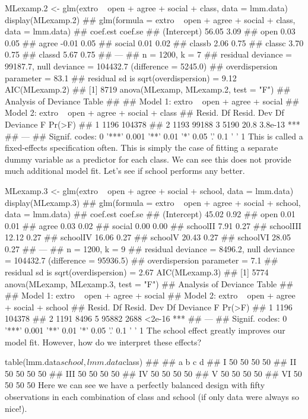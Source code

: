 MLexamp.2 <- glm(extro ~ open + agree + social + class, data = lmm.data)
display(MLexamp.2)
## glm(formula = extro ~ open + agree + social + class, data = lmm.data)
##             coef.est coef.se
## (Intercept) 56.05     3.09  
## open         0.03     0.05  
## agree       -0.01     0.05  
## social       0.01     0.02  
## classb       2.06     0.75  
## classc       3.70     0.75  
## classd       5.67     0.75  
## ---
##   n = 1200, k = 7
##   residual deviance = 99187.7, null deviance = 104432.7 (difference = 5245.0)
##   overdispersion parameter = 83.1
##   residual sd is sqrt(overdispersion) = 9.12
AIC(MLexamp.2)
## [1] 8719
anova(MLexamp, MLexamp.2, test = "F")
## Analysis of Deviance Table
## 
## Model 1: extro ~ open + agree + social
## Model 2: extro ~ open + agree + social + class
##   Resid. Df Resid. Dev Df Deviance    F  Pr(>F)    
## 1      1196     104378                             
## 2      1193      99188  3     5190 20.8 3.8e-13 ***
## ---
## Signif. codes:  0 '***' 0.001 '**' 0.01 '*' 0.05 '.' 0.1 ' ' 1
This is called a fixed-effects specification often. This is simply the case of fitting a separate dummy variable as a predictor for each class. We can see this does not provide much additional model fit. Let's see if school performs any better.

MLexamp.3 <- glm(extro ~ open + agree + social + school, data = lmm.data)
display(MLexamp.3)
## glm(formula = extro ~ open + agree + social + school, data = lmm.data)
##             coef.est coef.se
## (Intercept) 45.02     0.92  
## open         0.01     0.01  
## agree        0.03     0.02  
## social       0.00     0.00  
## schoolII     7.91     0.27  
## schoolIII   12.12     0.27  
## schoolIV    16.06     0.27  
## schoolV     20.43     0.27  
## schoolVI    28.05     0.27  
## ---
##   n = 1200, k = 9
##   residual deviance = 8496.2, null deviance = 104432.7 (difference = 95936.5)
##   overdispersion parameter = 7.1
##   residual sd is sqrt(overdispersion) = 2.67
AIC(MLexamp.3)
## [1] 5774
anova(MLexamp, MLexamp.3, test = "F")
## Analysis of Deviance Table
## 
## Model 1: extro ~ open + agree + social
## Model 2: extro ~ open + agree + social + school
##   Resid. Df Resid. Dev Df Deviance    F Pr(>F)    
## 1      1196     104378                            
## 2      1191       8496  5    95882 2688 <2e-16 ***
## ---
## Signif. codes:  0 '***' 0.001 '**' 0.01 '*' 0.05 '.' 0.1 ' ' 1
The school effect greatly improves our model fit. However, how do we interpret these effects?

table(lmm.data$school, lmm.data$class)
##      
##        a  b  c  d
##   I   50 50 50 50
##   II  50 50 50 50
##   III 50 50 50 50
##   IV  50 50 50 50
##   V   50 50 50 50
##   VI  50 50 50 50
Here we can see we have a perfectly balanced design with fifty observations in each combination of class and school (if only data were always so nice!).

